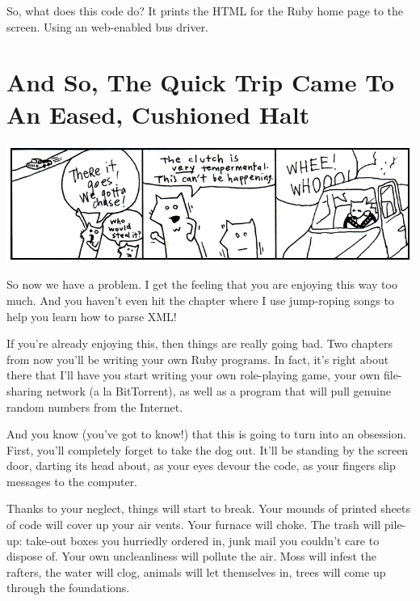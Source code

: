 \documentclass[10pt,twoside]{report}
\begin{document}
So, what does this code do?  It prints the HTML for the Ruby home page
to the screen.  Using an web-enabled bus driver.


\section{And So, The Quick Trip Came To An Eased, Cushioned Halt}


	\includegraphics[width=1.0\textwidth]{cache/18.png}

So now we have a problem.  I get the feeling that you are enjoying
this way too much. And you haven't even hit the chapter where I use
jump-roping songs to help you learn how to parse XML!

If you're already enjoying this, then things are really going bad.
Two chapters from now you'll be writing your own Ruby programs.  In
fact, it's right about there that I'll have you start writing your own
role-playing game, your own file-sharing network (a la BitTorrent), as
well as a program that will pull genuine random numbers from the
Internet.


And you know (you've got to know!) that this is going to turn into an
obsession.  First, you'll completely forget to take the dog out.
It'll be standing by the screen door, darting its head about, as your
eyes devour the code, as your fingers slip messages to the computer.

Thanks to your neglect, things will start to break.  Your mounds of
printed sheets of code will cover up your air vents.  Your furnace
will choke.  The trash will pile-up: take-out boxes you hurriedly
ordered in, junk mail you couldn't care to dispose of.  Your own
uncleanliness will pollute the air.  Moss will infest the rafters, the
water will clog, animals will let themselves in, trees will come up
through the foundations.
\end{document}
